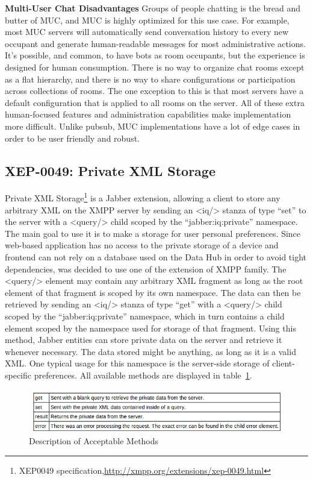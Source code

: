 	\textbf{Multi-User Chat Disadvantages}
	\newline
	Groups of people chatting is the bread and butter of MUC, and MUC is highly optimized for this use case. For example, most MUC servers will automatically send conversation history to every new occupant and generate human-readable messages for most administrative actions. It's possible, and common, to have bots as room occupants, but the experience is designed for human consumption. There is no way to organize chat rooms except as a flat hierarchy, and there is no way to share configurations or participation across collections of rooms. The one exception to this is that most servers have a default configuration that is applied to all rooms on the server. All of these extra human-focused features and administration capabilities make implementation more difficult. Unlike pubsub, MUC implementations have a lot of edge cases in order to be user friendly and robust.


\subsection{XEP-0049: Private XML Storage}
	Private XML Storage\footnote{XEP0049 specification,\url{http://xmpp.org/extensions/xep-0049.html}} is a Jabber extension, allowing a client to store any arbitrary XML on the XMPP server by sending an <iq/> stanza of type ``set'' to the server with a <query/> child scoped by the ``jabber:iq:private'' namespace. The main goal to use it is to make a storage for user personal preferences. Since web-based application has no access to the private storage of a device and frontend can not rely on a database used on the Data Hub in order to avoid tight dependencies, was decided to use one of the extension of XMPP family. The <query/> element may contain any arbitrary XML fragment as long as the root element of that fragment is scoped by its own namespace. The data can then be retrieved by sending an <iq/> stanza of type ``get'' with a <query/> child scoped by the ``jabber:iq:private'' namespace, which in turn contains a child element scoped by the namespace used for storage of that fragment. Using this method, Jabber entities can store private data on the server and retrieve it whenever necessary. The data stored might be anything, as long as it is a valid XML. One typical usage for this namespace is the server-side storage of client-specific preferences. All available methods are displayed in table~\ref{img:xep49-methods}.
	
	\begin{figure}[!ht]
		\centering
		\includegraphics[scale=0.9]{images/xep0049Queries.png}   
		\caption[ Description of Acceptable Methods]{Description of Acceptable Methods}
		\label{img:xep49-methods}
		\end{figure}
